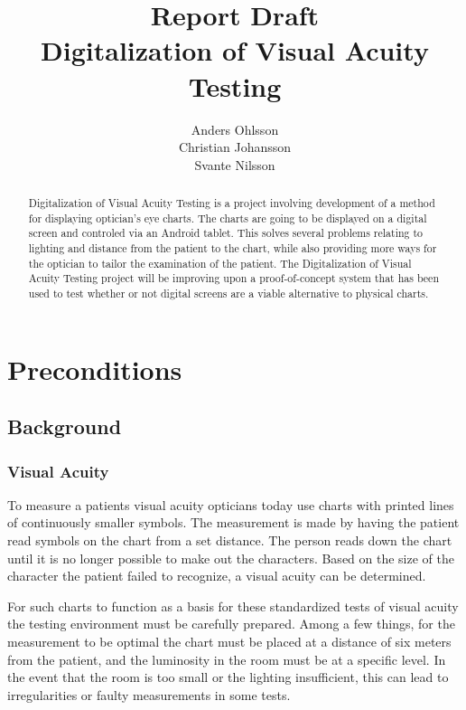 \documentclass[12pt,a4paper,notitlepage]{report}
\begin{document}
\title{Report Draft\\Digitalization of Visual Acuity Testing}
\author{Anders Ohlsson\\Christian Johansson\\Svante Nilsson}
\maketitle

\begin{abstract}
Digitalization of Visual Acuity Testing is a project involving development of a method for displaying optician's eye charts. The charts are going to be displayed on a digital screen and controled via an Android tablet. This solves several problems relating to lighting and distance from the patient to the chart, while also providing more ways for the optician to tailor the examination of the patient. The Digitalization of Visual Acuity Testing project will be improving upon a proof-of-concept system that has been used to test whether or not digital screens are a viable alternative to physical charts.
\end{abstract}
\thispagestyle{empty}
\clearpage

\tableofcontents
\thispagestyle{empty}
\clearpage

\setcounter{page}{1}
\chapter{Preconditions}
\section{Background}
\subsection{Visual Acuity}
To measure a patients visual acuity opticians today use charts with printed lines of continuously smaller symbols. The measurement is made by having the patient read symbols on the chart from a set distance. The person reads down the chart until it is no longer possible to make out the characters. Based on the size of the character the patient failed to recognize, a visual acuity can be determined. 

For such charts to function as a basis for these standardized tests of visual acuity the testing environment must be carefully prepared. Among a few things, for the measurement to be optimal the chart must be placed at a distance of six meters from the patient, and the luminosity in the room must be at a specific level. In the event that the room is too small or the lighting insufficient, this can lead to irregularities or faulty measurements in some tests. 
\end{document}
